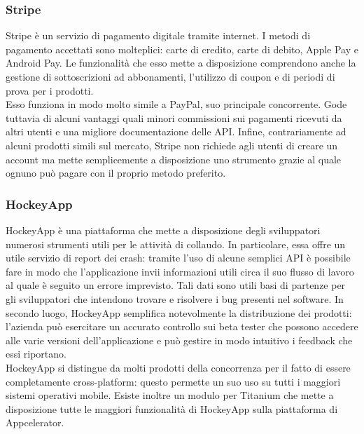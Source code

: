 			\subsubsection{Stripe}
				Stripe è un servizio di pagamento digitale tramite internet. I metodi di pagamento accettati sono molteplici: carte
				di credito, carte di debito, Apple Pay e Android Pay. Le funzionalità che esso mette a disposizione comprendono
				anche la gestione di sottoscrizioni ad abbonamenti, l'utilizzo di coupon e di periodi di prova per i prodotti.\\
				Esso funziona in modo molto simile a PayPal, suo principale concorrente. Gode tuttavia di alcuni vantaggi quali
				minori commissioni sui pagamenti ricevuti da altri utenti e una migliore documentazione delle API. Infine,
				contrariamente ad alcuni prodotti simili sul mercato, Stripe non richiede agli utenti di creare un account ma mette
				semplicemente a disposizione uno strumento grazie al quale ognuno può pagare con il proprio metodo preferito.
			\subsubsection{HockeyApp}
				HockeyApp è una piattaforma che mette a disposizione degli sviluppatori numerosi strumenti utili per le attività
				di collaudo. In particolare, essa offre un utile servizio di report dei crash: tramite l'uso di alcune semplici API è
				possibile fare in modo che l'applicazione invii informazioni utili circa il suo flusso di lavoro al quale è seguito
				un errore imprevisto. Tali dati sono utili basi di partenze per gli sviluppatori che intendono trovare e risolvere i
				bug presenti nel software. In secondo luogo, HockeyApp semplifica notevolmente la distribuzione dei prodotti:
				l'azienda può esercitare un accurato controllo sui beta tester che possono accedere alle varie versioni
				dell'applicazione e può gestire in modo intuitivo i feedback che essi riportano.\\
				HockeyApp si distingue da molti prodotti della concorrenza per il fatto di essere completamente cross-platform:
				questo permette un suo uso su tutti i maggiori sistemi operativi mobile. Esiste inoltre un modulo per Titanium che
				mette a disposizione tutte le maggiori funzionalità di HockeyApp sulla piattaforma di Appcelerator.
